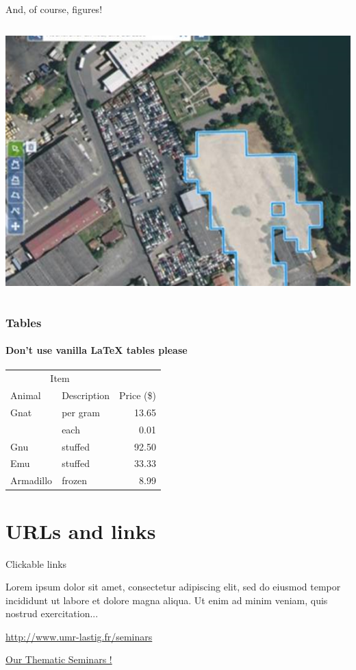 \documentclass[11pt,aspectratio=169]{beamer}
\begin{document}
\begin{frame}{And, of course, figures!}
\begin{columns}
\begin{column}{0.33\textwidth}
			\includegraphics[width=\columnwidth]{example-image-3}
		\end{column}
	\end{columns}

\end{frame}
\begin{frame}

	\frametitle{Tables}
	\framesubtitle{Don't use vanilla \LaTeX{}  tables please}
	
		\begin{center}
			\begin{tabular}{@{}llr@{}}
				\toprule\multicolumn{2}{c}{Item} \\
				\cmidrule(r){1-2}Animal & Description & Price (\$)\\
				\midrule
				Gnat  & per gram  & 13.65 \\
				& each      & 0.01 \\
				Gnu   & stuffed   & 92.50 \\
				Emu   & stuffed   & 33.33 \\
				Armadillo & frozen & 8.99 \\
				\bottomrule
			\end{tabular}
		\end{center}

\end{frame}

\section{URLs and links}
\begin{frame}{Clickable links}

	Lorem ipsum dolor sit amet, consectetur adipiscing elit, sed do eiusmod tempor incididunt ut labore et dolore magna aliqua. 
	Ut enim ad minim veniam, quis nostrud exercitation...
	
	\medskip

	\url{http://www.umr-lastig.fr/seminars}
	
	\href{http://www.umr-lastig.fr/seminars}{Our Thematic Seminars !}
	

\end{frame}
\end{document}
